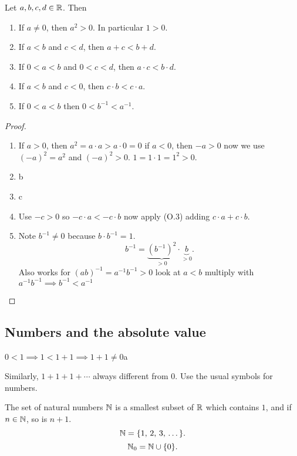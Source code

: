 \documentclass[10pt, a4paper]{article}
\begin{document}
\begin{proposition}\label{prop:anly:prop1}
    Let $a, b, c, d \in \mathbb{R}$. Then
    \begin{enumerate}[label = (\alph*)]
        \item If $a \neq 0$, then $a ^ 2 > 0$. In particular $1 > 0$.
        \item If $a < b$ and $c < d$, then $a + c < b + d$.
        \item If $0 < a < b$ and $0 < c < d$, then $a \cdot c < b \cdot d$.
        \item If $a < b$ and $c < 0$, then $c \cdot b < c \cdot a$.
        \item If $0 < a < b$ then $0 < b ^ {-1} < a ^ {-1}$.
    \end{enumerate}

    \begin{proof}\phantom{}
        \begin{enumerate}[label = (\alph*)]
            \item If $a > 0$, then $a ^ 2 = a \cdot a > a \cdot 0 = 0$
            if $a < 0$, then $-a > 0$ now we use $(-a) ^ 2 = a ^ 2$ and $(-a) ^ 2 > 0$. $1 = 1 \cdot 1 = 1 ^ 2 > 0$.

            \item b
            \item c
            \item Use $-c > 0$ so $-c \cdot a < -c \cdot b$ now apply (O.3) adding $c \cdot a + c \cdot b$.
            \item Note $b ^ {-1} \neq 0$ because $b \cdot b ^ {-1} = 1$.
            \[
            b ^ {-1} = \underbrace{(b ^ {-1}) ^ 2}_{> 0} \cdot \underbrace{b}_{> 0}.
            \]
            Also works for $(ab) ^ {-1} = a^{-1}b ^ {-1} > 0$ look at $a < b$ multiply with $a ^ {-1} b ^ {-1} \implies b ^ {-1} < a ^ {-1}$
        \end{enumerate}
    \end{proof}
\end{proposition}

\subsection{Numbers and the absolute value}
$0 < 1 \implies 1 < 1 + 1 \implies 1 + 1 \neq 0$a

Similarly, $1 + 1 + 1 + \dotsi$ always different from $0$. Use the usual symbols for numbers.

\begin{definition}
    The set of natural numbers $\mathbb{N}$ is a smallest subset of $\mathbb{R}$ which contains $1$, and if $n \in \mathbb{N}$, so is $n + 1$.
    \[
    \mathbb{N} = \{1,\,2,\,3,\,\dotsc\}.
    \]
    \[
    \mathbb{N}_0 = \mathbb{N} \cup \{0\}.
    \]
\end{definition}
\end{document}
